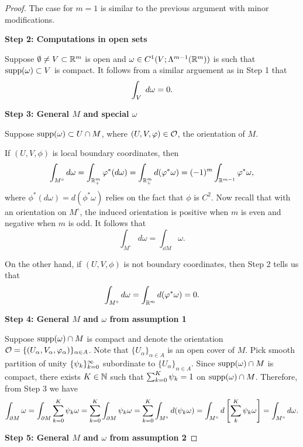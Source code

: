 \documentclass[a4paper]{article}
\begin{document}
\begin{proof}
The case for $m = 1$ is similar to the previous argument
with minor modifications.

\textbf{Step 2: Computations in open sets}

Suppose $\emptyset \neq V \subset \mathbb{R}^m$ is open and
$\omega \in C^1 (V; \Lambda^{m-1} (\mathbb{R}^m))$ is such that
$\operatorname{supp}(\omega) \subset V$ is compact. It follows
from a similar arguement as in Step 1 that
\[
\int_V \; d \omega = 0.
\]

\textbf{Step 3: General $M$ and special $\omega$}

Suppose $\operatorname{supp}(\omega) \subset U \cap M$, where
$(U, V, \varphi) \in \mathcal{O}$, the orientation of $M$.

If $(U, V, \phi)$ is local boundary coordinates, then
\[
\int_{M^\circ} d \omega
= \int_{\mathbb{R}^m_+} \varphi^* (d \omega)
= \int_{\mathbb{R}^m_+} d (\varphi^* \omega)
= (-1)^m \int_{\mathbb{R}^{m-1}} \varphi^* \omega,
\]
where $\phi^* (d \omega) = d (\phi^* \omega)$ relies
on the fact that $\phi$ is $C^2$. Now recall that
with an orientation on $M^\circ$, the induced orientation
is positive when $m$ is even and negative when $m$ is odd.
It follows that
\[
\int_{M^\circ} d \omega = \int_{\dd M} \omega.
\]

On the other hand, if $(U, V, \phi)$ is not boundary
coordinates, then Step 2 tells us that
\[
\int_{M^\circ} d \omega = \int_{\mathbb{R}^m} d (\varphi^* \omega) = 0.
\]

\textbf{Step 4: General $M$ and $\omega$ from assumption 1}

Suppose $\operatorname{supp}(\omega) \cap M$ is compact and denote the
orientation
$\mathcal{O} = \{(U_\alpha, V_\alpha, \varphi_\alpha)\}_{\alpha \in A}$.
Note that $\{U_\alpha\}_{\alpha \in A}$ is an open cover of
$M$. Pick smooth partition of unity $\{ \psi_k \}_{k=0}^\infty$
subordinate to $\{U_\alpha\}_{\alpha \in A}$. Since
$\operatorname{supp}(\omega) \cap M$ is compact, there exists $K \in \mathbb{N}$
such that $\sum_{k=0}^K \psi_k = 1$ on $\operatorname{supp}(\omega) \cap M$.
Therefore, from Step 3 we have
\[
\int_{\partial M} \omega
= \int_{\partial M} \sum_{k=0}^K \psi_k \omega
= \sum_{k=0}^K \int_{\partial M} \psi_k \omega
= \sum_{k=0}^K \int_{M^\circ} d (\psi_k \omega)
= \int_{M^\circ} d \left[ \sum_k^K \psi_k \omega \right]
= \int_{M^\circ} d \omega.
\]

\textbf{Step 5: General $M$ and $\omega$ from assumption 2}


\end{proof}
\end{document}
